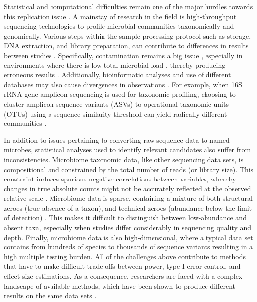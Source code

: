 Statistical and computational difficulties remain one of the major hurdles towards this replication issue \cite{li2015microbiome, li2019comparative}. A mainstay of research in the field is high-throughput sequencing technologies to profile microbial communities taxonomically and genomically. Various steps within the sample processing protocol such as storage, DNA extraction, and library preparation, can contribute to differences in results between studies \cite{clausen2021evaluating}. Specifically, contamination remains a big issue \cite{}, especially in environments where there is low total microbial load \cite{}, thereby producing erroneous results \cite{}. Additionally, bioinformatic analyses and use of different databases may also cause divergences in observations \cite{moossavi2020biological}. For example, when 16S rRNA gene amplicon sequencing is used for taxonomic profiling, choosing to cluster amplicon sequence variants (ASVs) to operational taxonomic units (OTUs) using a sequence similarity threshold can yield radically different communities \cite{chiarello2022ranking, moossavi2020biological}.   

In addition to issues pertaining to converting raw sequence data to named microbes, statistical analyses used to identify relevant candidates also suffer from inconsistencies. Microbiome taxonomic data, like other sequencing data sets, is compositional \cite{gloor2017microbiome, quinn2019field} and constrained by the total number of reads (or library size). This constraint induces spurious negative correlations between variables, whereby changes in true absolute counts might not be accurately reflected at the observed relative scale \cite{lin2020analysis, morton2019establishing}. Microbiome data is sparse, containing a mixture of both structural zeroes (true absence of a taxon), and technical zeroes (abundance below the limit of detection) \cite{kaul2017analysis, silverman2020naught}. This makes it difficult to distinguish between low-abundance and absent taxa, especially when studies differ considerably in sequencing quality and depth. Finally, microbiome data is also high-dimensional, where a typical data set contains from hundreds of species to thousands of sequence variants resulting in a high multiple testing burden. All of the challenges above contribute to methods that have to make difficult trade-offs between power, type I error control, and effect size estimations. As a consequence, researchers are faced with a complex landscape of available methods, which have been shown to produce different results on the same data sets \cite{nearing2022microbiome}.   

